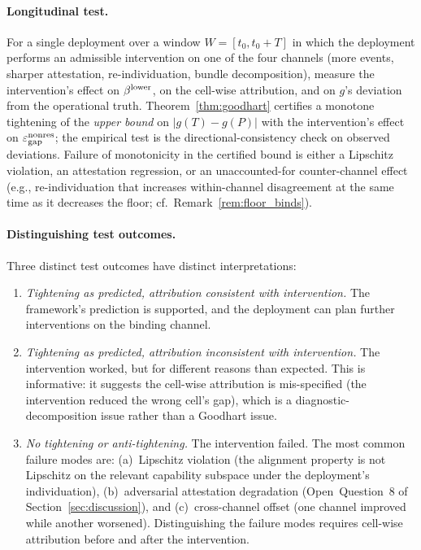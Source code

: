 \paragraph{Longitudinal test.}
For a single deployment over a window $W = [t_0, t_0 + T]$ in
which the deployment performs an admissible intervention on one
of the four channels (more events, sharper attestation,
re-individuation, bundle decomposition), measure the
intervention's effect on $\beta^{\mathrm{lower}}$, on the cell-wise attribution,
and on $g$'s deviation from the operational truth.
Theorem~\ref{thm:goodhart} certifies a monotone tightening of
the \emph{upper bound} on $|g(T) - g(P)|$ with the
intervention's effect on $\varepsilon_{\mathrm{gap}}^{\mathrm{nonres}}$; the empirical test is the
directional-consistency check on observed deviations.  Failure
of monotonicity in the certified bound is either a Lipschitz
violation, an attestation regression, or an unaccounted-for
counter-channel effect (e.g., re-individuation that increases
within-channel disagreement at the same time as it decreases
the floor; cf.\ Remark~\ref{rem:floor_binds}).

\paragraph{Distinguishing test outcomes.}
Three distinct test outcomes have distinct interpretations:
\begin{enumerate}
\item \emph{Tightening as predicted, attribution consistent
  with intervention.}  The framework's prediction is supported,
  and the deployment can plan further interventions on the
  binding channel.
\item \emph{Tightening as predicted, attribution inconsistent
  with intervention.}  The intervention worked, but for
  different reasons than expected.  This is informative: it
  suggests the cell-wise attribution is mis-specified (the
  intervention reduced the wrong cell's gap), which is a
  diagnostic-decomposition issue rather than a Goodhart
  issue.
\item \emph{No tightening or anti-tightening.}  The intervention
  failed.  The most common failure modes are: (a)~Lipschitz
  violation (the alignment property is not Lipschitz on the
  relevant capability subspace under the deployment's
  individuation), (b)~adversarial attestation degradation
  (Open~Question~8 of Section~\ref{sec:discussion}), and
  (c)~cross-channel offset (one channel improved while another
  worsened).  Distinguishing the failure modes requires
  cell-wise attribution before and after the intervention.
\end{enumerate}

